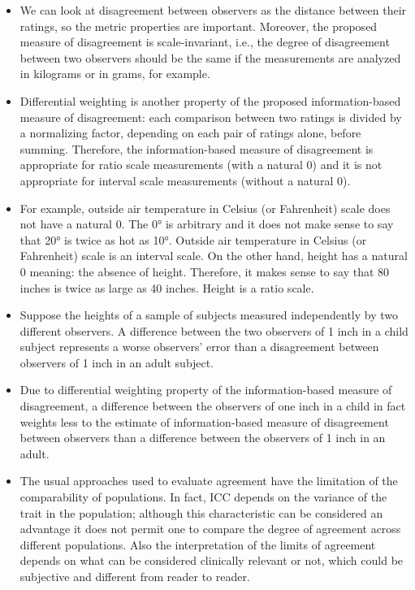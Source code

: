 \documentclass[12pt, a4paper]{report}
\theoremstyle{plain}
\theoremstyle{definition}
\theoremstyle{remark}
\begin{document}
	\begin{itemize}
		\item We can look at disagreement between observers as the distance between their ratings, so the metric properties are important. Moreover, the proposed measure of disagreement is scale-invariant, i.e., the degree of disagreement between two observers should be the same if the measurements are analyzed in kilograms or in grams, for example.
		
		\item Differential weighting is another property of the proposed information-based measure of disagreement: each comparison between two ratings is divided by a normalizing factor, depending on each pair of ratings alone, before summing. Therefore, the information-based measure of disagreement is appropriate for ratio scale measurements (with a natural 0) and it is not appropriate for interval scale measurements (without a natural 0). 
		
		\item For example, outside air temperature in Celsius (or Fahrenheit) scale does not have a natural 0. The 0° is arbitrary and it does not make sense to say that 20° is twice as hot as 10°. Outside air temperature in Celsius (or Fahrenheit) scale is an interval scale. On the other hand, height has a natural 0 meaning: the absence of height. Therefore, it makes sense to say that 80 inches is twice as large as 40 inches. Height is a ratio scale. 
		
		\item Suppose the heights of a sample of subjects measured independently by two different observers. A difference between the two observers of 1 inch in a child subject represents a worse observers' error than a disagreement between observers of 1 inch in an adult subject. 
		
		\item Due to differential weighting property of the information-based measure of disagreement, a difference between the observers of one inch in a child in fact weights less to the estimate of information-based measure of disagreement between observers than a difference between the observers of 1 inch in an adult.
		
		\item The usual approaches used to evaluate agreement have the limitation of the comparability of populations. In fact, ICC depends on the variance of the trait in the population; although this characteristic can be considered an advantage it does not permit one to compare the degree of agreement across different populations. Also the interpretation of the limits of agreement depends on what can be considered clinically relevant or not, which could be subjective and different from reader to reader. 
		

\end{itemize}
\end{document}
